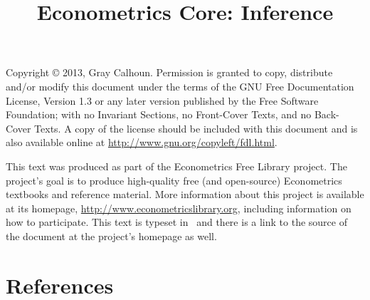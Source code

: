 \documentclass[nofonts]{tufte-latex/tufte-handout}
\title{Econometrics Core: Inference}
\begin{document}
\maketitle

\bigskip\noindent%
Copyright © 2013, Gray Calhoun.  Permission is granted to copy,
distribute and/or modify this document under the terms of the GNU Free
Documentation License, Version 1.3 or any later version published by
the Free Software Foundation; with no Invariant Sections, no
Front-Cover Texts, and no Back-Cover Texts.  A copy of the license
should be included with this document and is also available online at
\url{http://www.gnu.org/copyleft/fdl.html}.

This text was produced as part of the Econometrics Free Library
project.  The project's goal is to produce high-quality free (and
open-source) Econometrics textbooks and reference material.  More
information about this project is available at its homepage,
\url{http://www.econometricslibrary.org}, including information on how
to participate.  This text is typeset in \XeLaTeX\ and there is a link
to the source of the document at the project's homepage as well.

%
\tableofcontents










\part*{References}%

\end{document}
